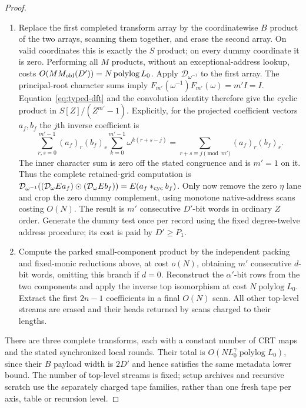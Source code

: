 \documentclass[11pt]{article}
\newcommand{\polylog}{\operatorname{polylog}}
\begin{document}
\begin{proof}
\begin{enumerate}
boundaries are used in this identity. Their valid block has entries
in $S$, so a complete transform returns $S$-valued words when its
input was $S$-valued. Keep the unused $\eta$ lane allocated nonetheless.
\item Replace the first completed transform array by the coordinatewise
$B$ product of the two arrays, scanning them together, and erase the
second array. On valid coordinates this is exactly the $S$ product;
on every dummy coordinate it is zero. Performing all $M$ products,
without an exceptional-address lookup, costs
$O(MM_{\rm old}(D'))=N\polylog L_0$. Apply
$\mathcal D_{\omega^{-1}}$ to the first array. The principal-root
character sums imply
$F_{m'}(\omega^{-1})F_{m'}(\omega)=m'I=I$.
Equation~\eqref{eq:typed-dft} and the convolution identity therefore
give the cyclic product in $S[Z]/(Z^{m'}-1)$.
Explicitly, for the projected coefficient vectors $a_f,b_f$ the
$j$th inverse coefficient is
\[
 \sum_{r,s=0}^{m'-1}(a_f)_r(b_f)_s
       \sum_{k=0}^{m'-1}\omega^{k(r+s-j)}
   =\sum_{r+s\equiv j\pmod {m'}}(a_f)_r(b_f)_s.
\]
The inner character sum is zero off the stated congruence and is
$m'=1$ on it. Thus the complete retained-grid computation is
$\mathcal D_{\omega^{-1}}
 ((\mathcal D_\omega E a_f)\odot(\mathcal D_\omega E b_f))
 =E(a_f*_{\rm cyc} b_f)$.
Only now remove the zero $\eta$ lane and crop the zero dummy complement,
using monotone native-address scans costing $O(N)$. The result is
$m'$ consecutive $D'$-bit words in ordinary $Z$ order.
Generate the dummy test once per record using the fixed degree-twelve
address procedure; its cost is paid by $D'\ge P_1$.
\item Compute the parked small-component product by the independent
packing and fixed-monic reductions above, at cost $o(N)$, obtaining
$m'$ consecutive $d$-bit words, omitting this branch if $d=0$.
Reconstruct the $\alpha'$-bit rows from
the two components and apply the inverse top isomorphism at cost
$N\polylog L_0$. Extract the first $2n-1$ coefficients in a final
$O(N)$ scan. All other top-level streams are erased and their heads
returned by scans charged to their lengths.
\end{enumerate}
There are three complete transforms, each with a constant number of CRT
maps and the stated synchronized local rounds. Their total is
$O(NL_0^\gamma\polylog L_0)$, since their $B$ payload width is $2D'$
and hence satisfies the same metadata lower bound. The number of
top-level streams is fixed; setup archives and recursive scratch use
the separately charged tape families, rather than one fresh tape per
axis, table or recursion level.
\end{proof}
\end{document}
